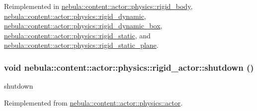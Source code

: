 Reimplemented in \hyperlink{classnebula_1_1content_1_1actor_1_1physics_1_1rigid__body_a60e13499d8c37d216d3f25415ef33041}{nebula::content::actor::physics::rigid\_\-body}, \hyperlink{classnebula_1_1content_1_1actor_1_1physics_1_1rigid__dynamic_a24bc7fc5707d3d387e57d0516f1cbd0e}{nebula::content::actor::physics::rigid\_\-dynamic}, \hyperlink{classnebula_1_1content_1_1actor_1_1physics_1_1rigid__dynamic__box_a4125f63982e9dfee274ab2721893bc28}{nebula::content::actor::physics::rigid\_\-dynamic\_\-box}, \hyperlink{classnebula_1_1content_1_1actor_1_1physics_1_1rigid__static_aa845026fbca4fa5967ac9d8ffcb2e10a}{nebula::content::actor::physics::rigid\_\-static}, and \hyperlink{classnebula_1_1content_1_1actor_1_1physics_1_1rigid__static__plane_af65fe2333f202fcf0dc9b95f00793c88}{nebula::content::actor::physics::rigid\_\-static\_\-plane}.\hypertarget{classnebula_1_1content_1_1actor_1_1physics_1_1rigid__actor_a19cfcb68b5be57574d96ffe856131aed}{
\subsubsection[{shutdown}]{\setlength{\rightskip}{0pt plus 5cm}void nebula::content::actor::physics::rigid\_\-actor::shutdown ()}}
\label{classnebula_1_1content_1_1actor_1_1physics_1_1rigid__actor_a19cfcb68b5be57574d96ffe856131aed}


shutdown 

Reimplemented from \hyperlink{classnebula_1_1content_1_1actor_1_1physics_1_1actor_ae995fe68be64a916df1bb7174cb8c7a3}{nebula::content::actor::physics::actor}.

